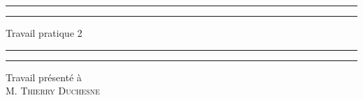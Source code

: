\documentclass{article}
\begin{document}
	\renewcommand{\tablename}{Tableau}
	\renewcommand{\figurename}{Illustration}
	\renewenvironment{proof}{\noindent{\bfseries Démonstration.}}{\qed\\}
	\renewcommand{\natural}{\mathbb{N}}
	
	\newcommand{\VaR}{\mathrm{VaR}}
	\newcommand{\var}{\mathrm{Var}}
	\newcommand{\cov}{\mathrm{Cov}}
	\newcommand{\TVaR}{\mathrm{TVaR}}
	\newcommand{\E}{\mathbb{E}}
	\renewcommand{\P}{\mathbb{P}}
	\newcommand{\reel}{\mathbb{R}}
	
	\begin{titlepage}
		\centering %
		
		\scshape %
		
		\vspace*{7\baselineskip} %
		
		
		\rule{\textwidth}{1.6pt}\vspace*{-\baselineskip}\vspace*{2pt} %
		\rule{\textwidth}{0.4pt} %
		
		\vspace{0.75\baselineskip} %
		{\LARGE Travail pratique 2\\} %
		\vspace{0.75\baselineskip} %
		
		\rule{\textwidth}{0.4pt}\vspace*{-\baselineskip}\vspace{3.2pt} %
		\rule{\textwidth}{1.6pt} %
		
		\vspace{4\baselineskip} %
		
		
		Travail présenté à \\
		{\scshape\Large M. Thierry Duchesne\\}
		
		\vspace*{4\baselineskip}
		

\end{titlepage}
\end{document}

